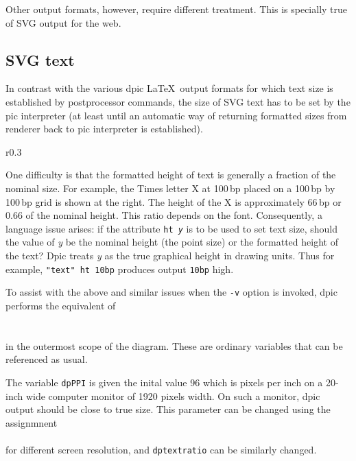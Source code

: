 \documentclass[11pt]{article}
\newcommand{\bq}{}
\newcommand{\pic}{{\bq pic}\xspace}
\newcommand{\Dpic}{{\bq Dpic}\xspace}
\newcommand{\dpic}{{\bq dpic}\xspace}
\newcommand{\ntt}[1]{\\\hbox{}\quad{\tt #1}}
\begin{document}
  Other output formats, however, require different treatment.
  This is specially true of SVG output for the web.

\subsection{SVG text\label{SVGtext:}}
  In contrast with the various dpic \LaTeX\ output formats for which
  text size is established by postprocessor commands,
  the size of SVG text has to be set by the \pic interpreter
  (at least until an automatic way of returning formatted sizes from
  renderer back to \pic interpreter is established).
\begin{wrapfigure}[9]{r}{0.3\textwidth}%
  \vspace*{-\baselineskip}%
  \hspace*{1em}%
  \parbox{0.3\textwidth}{}%
 \end{wrapfigure}%
  One difficulty is that
  the formatted height of text is generally a fraction of the nominal size.
  For example, the Times letter X at 100\,bp placed on a 100\,bp by
  100\,bp grid is shown at the right.
  The height of the X is
  approximately 66\,bp or 0.66 of the nominal height.
  This ratio depends on the font.
  Consequently, a language issue arises: if the attribute {\tt ht~{\it y}}
  is to be used to set text size,
  should the value of {\it y} be the nominal height (the point size) or
  the formatted height of the text?
  \Dpic treats
  {\it y} as the true graphical height in drawing units.
  Thus for example, {\tt "text" ht 10bp} produces output {\tt 10bp} high.

  To assist with the above and similar issues
  when the {\tt -v} option is invoked, \dpic performs the equivalent
  of
    \ntt{dpPPI = 96}
    \ntt{dptextratio = 0.66}\\
  in the outermost scope of the diagram.  These are ordinary variables
  that can be referenced as usual.

  The variable {\tt dpPPI} is given the inital value 96 which is
  pixels per inch
  on a 20-inch wide computer monitor of 1920 pixels width.
  On such a monitor, dpic output should be close to true size.
  This parameter can be changed using the assignmnent
    \ntt{dpPPI := {\sl value}}\\
  for different screen resolution, and {\tt dptextratio} can
  be similarly changed. 
\end{document}
